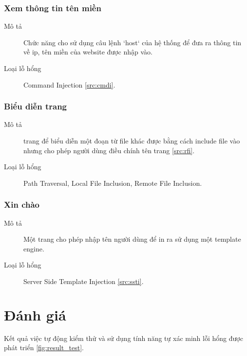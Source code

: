 \documentclass[./../main.tex]{subfiles}
\begin{document}
\subsubsection{Xem thông tin tên miền}

\begin{description}
	\item[Mô tả] Chức năng cho sử dụng câu lệnh `host` của hệ thống để đưa ra thông tin về ip, tên miền của website được nhập vào.
	\item[Loại lỗ hổng] Command Injection \ref{src:cmdi}.
\end{description}

\subsubsection{Biểu diễn trang}

\begin{description}
	\item[Mô tả] trang để biểu diễn một đoạn từ file khác được bằng cách
	      include file vào nhưng cho phép người dùng điều chính tên trang \ref{src:rfi}.
	\item[Loại lỗ hổng] Path Traversal, Local File Inclusion, Remote
	      File Inclusion.
\end{description}

\subsubsection{Xin chào}

\begin{description}
	\item[Mô tả] Một trang cho phép nhập tên người dùng để in ra sử dụng một template engine.
	\item[Loại lỗ hổng] Server Side Template Injection \ref{src:ssti}.
\end{description}


\section{Đánh giá}

Kết quả việc tự động kiểm thử và sử dụng tính năng tự xác minh lỗi
hổng được phát triển \ref{fig:result_test}.
\end{document}
